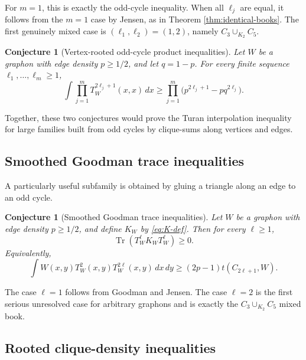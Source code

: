 \documentclass[11pt]{article}
\newtheorem{conjecture}[theorem]{Conjecture}
\theoremstyle{definition}
\newcommand{\Tr}{\operatorname{Tr}}
\begin{document}
For $m=1$, this is exactly the odd-cycle inequality.  When all $\ell_j$ are equal, it follows from the $m=1$ case by Jensen, as in Theorem \ref{thm:identical-books}.  The first genuinely mixed case is $(\ell_1,\ell_2)=(1,2)$, namely $C_3\cup_{K_2}C_5$.

\begin{conjecture}[Vertex-rooted odd-cycle product inequalities]\label{conj:vertex-rooted-products}
Let $W$ be a graphon with edge density $p\ge1/2$, and let $q=1-p$.  For every finite sequence $\ell_1,\dots,\ell_m\ge1$,
\begin{equation}\label{eq:vertex-rooted-product-conj}
  \int \prod_{j=1}^m T_W^{2\ell_j+1}(x,x)\,dx
  \ge
  \prod_{j=1}^m\bigl(p^{2\ell_j+1}-p q^{2\ell_j}\bigr).
\end{equation}
\end{conjecture}

Together, these two conjectures would prove the Turan interpolation inequality for large families built from odd cycles by clique-sums along vertices and edges.

\subsection{Smoothed Goodman trace inequalities}

A particularly useful subfamily is obtained by gluing a triangle along an edge to an odd cycle.

\begin{conjecture}[Smoothed Goodman trace inequalities]\label{conj:SG}
Let $W$ be a graphon with edge density $p\ge1/2$, and define $K_W$ by \eqref{eq:K-def}.  Then for every $\ell\ge1$,
\begin{equation}\label{eq:SG-ell}
  \Tr(T_W^\ell K_WT_W^\ell)\ge0.
\end{equation}
Equivalently,
\begin{equation}\label{eq:local-goodman-ell}
  \int W(x,y)T_W^2(x,y)T_W^{2\ell}(x,y)\,dx\,dy
  \ge
  (2p-1)t(C_{2\ell+1},W).
\end{equation}
\end{conjecture}

The case $\ell=1$ follows from Goodman and Jensen.  The case $\ell=2$ is the first serious unresolved case for arbitrary graphons and is exactly the $C_3\cup_{K_2}C_5$ mixed book.

\subsection{Rooted clique-density inequalities}
\end{document}
